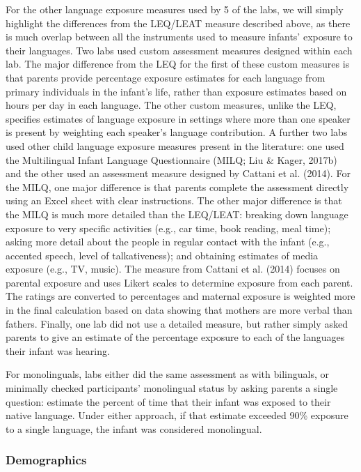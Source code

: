 \documentclass[,man,floatsintext]{apa6}
\begin{document}
For the other language exposure measures used by 5 of the labs, we will simply highlight the differences from the LEQ/LEAT measure described above, as there is much overlap between all the instruments used to measure infants' exposure to their languages. Two labs used custom assessment measures designed within each lab. The major difference from the LEQ for the first of these custom measures is that parents provide percentage exposure estimates for each language from primary individuals in the infant's life, rather than exposure estimates based on hours per day in each language. The other custom measures, unlike the LEQ, specifies estimates of language exposure in settings where more than one speaker is present by weighting each speaker's language contribution. A further two labs used other child language exposure measures present in the literature: one used the Multilingual Infant Language Questionnaire (MILQ; Liu \& Kager, 2017b) and the other used an assessment measure designed by Cattani et al. (2014). For the MILQ, one major difference is that parents complete the assessment directly using an Excel sheet with clear instructions. The other major difference is that the MILQ is much more detailed than the LEQ/LEAT: breaking down language exposure to very specific activities (e.g., car time, book reading, meal time); asking more detail about the people in regular contact with the infant (e.g., accented speech, level of talkativeness); and obtaining estimates of media exposure (e.g., TV, music). The measure from Cattani et al. (2014) focuses on parental exposure and uses Likert scales to determine exposure from each parent. The ratings are converted to percentages and maternal exposure is weighted more in the final calculation based on data showing that mothers are more verbal than fathers. Finally, one lab did not use a detailed measure, but rather simply asked parents to give an estimate of the percentage exposure to each of the languages their infant was hearing.

For monolinguals, labs either did the same assessment as with bilinguals, or minimally checked participants' monolingual status by asking parents a single question: estimate the percent of time that their infant was exposed to their native language. Under either approach, if that estimate exceeded 90\% exposure to a single language, the infant was considered monolingual.

\hypertarget{demographics}{%
\subsubsection{Demographics}\label{demographics}}
\end{document}
